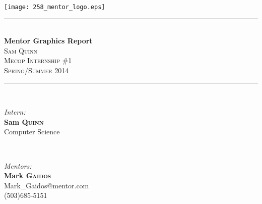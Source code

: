 \documentclass[letterpaper,10pt,notitlepage,fleqn]{article}
\begin{document}
\begin{titlepage}
\vspace*{\fill}

\newcommand{\HRule}{\rule{\linewidth}{0.5mm}} %

\center %


\texttt{[image: 258\_mentor\_logo.eps]}
\HRule \\[0.4cm]
{ \huge \bfseries Mentor Graphics Report}\\[0.4cm] %


\textsc{\LARGE Sam Quinn}\\[0.5cm] %
\textsc{\Large Mecop Internship \#1}\\[0.5cm] %
\textsc{\large Spring/Summer 2014}\\[0.5cm] %


\HRule \\[1.5cm]

\begin{minipage}{0.4\textwidth}
\begin{flushleft} \large
\emph{Intern:}\\
        \textbf{Sam \textsc{Quinn}} \\ %
        {\small Computer Science}
        \end{flushleft}
        \end{minipage}
        ~
        \begin{minipage}{0.4\textwidth}
        \begin{flushright} \large
        \emph{Mentors:} \\
            \textbf{Mark \textsc{Gaidos}} \\ %
            {\small Mark\_Gaidos@mentor.com \\
            (503)685-5151} \\
            

\end{flushright}
\end{minipage}
\end{titlepage}
\end{document}
